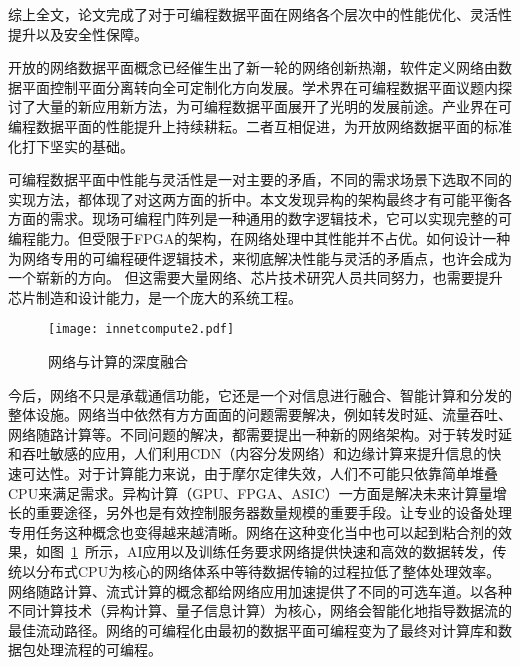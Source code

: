 综上全文，论文完成了对于可编程数据平面在网络各个层次中的性能优化、灵活性提升以及安全性保障。





\label{chap62}

\label{chap621}

开放的网络数据平面概念已经催生出了新一轮的网络创新热潮，软件定义网络由数据平面控制平面分离转向全可定制化方向发展。学术界在可编程数据平面议题内探讨了大量的新应用新方法，为可编程数据平面展开了光明的发展前途。产业界在可编程数据平面的性能提升上持续耕耘。二者互相促进，为开放网络数据平面的标准化打下坚实的基础。

可编程数据平面中性能与灵活性是一对主要的矛盾，不同的需求场景下选取不同的实现方法，都体现了对这两方面的折中。本文发现异构的架构最终才有可能平衡各方面的需求。现场可编程门阵列是一种通用的数字逻辑技术，它可以实现完整的可编程能力。但受限于FPGA的架构，在网络处理中其性能并不占优。如何设计一种为网络专用的可编程硬件逻辑技术，来彻底解决性能与灵活的矛盾点，也许会成为一个崭新的方向。
但这需要大量网络、芯片技术研究人员共同努力，也需要提升芯片制造和设计能力，是一个庞大的系统工程。




\label{chap622}

\begin{figure}[!ht]
	\centering 
	\vspace{-1.5mm} 
	\texttt{[image: innetcompute2.pdf]}
	\caption{网络与计算的深度融合} \label{fig:innetcompute}
\end{figure}

今后，网络不只是承载通信功能，它还是一个对信息进行融合、智能计算和分发的整体设施。网络当中依然有方方面面的问题需要解决，例如转发时延、流量吞吐、网络随路计算等。不同问题的解决，都需要提出一种新的网络架构。对于转发时延和吞吐敏感的应用，人们利用CDN（内容分发网络）和边缘计算来提升信息的快速可达性。对于计算能力来说，由于摩尔定律失效，人们不可能只依靠简单堆叠CPU来满足需求。异构计算（GPU、FPGA、ASIC）一方面是解决未来计算量增长的重要途径，另外也是有效控制服务器数量规模的重要手段。让专业的设备处理专用任务这种概念也变得越来越清晰。网络在这种变化当中也可以起到粘合剂的效果，如图~\ref{fig:innetcompute}~所示，AI应用以及训练任务要求网络提供快速和高效的数据转发，传统以分布式CPU为核心的网络体系中等待数据传输的过程拉低了整体处理效率。网络随路计算、流式计算的概念都给网络应用加速提供了不同的可选车道。以各种不同计算技术（异构计算、量子信息计算）为核心，网络会智能化地指导数据流的最佳流动路径。网络的可编程化由最初的数据平面可编程变为了最终对计算库和数据包处理流程的可编程。










